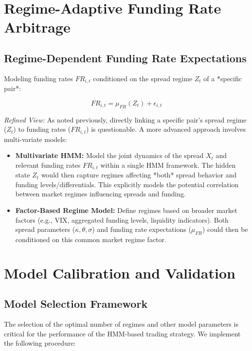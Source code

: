 \documentclass{article}
\begin{document}
\section{Regime-Adaptive Funding Rate Arbitrage}

\subsection{Regime-Dependent Funding Rate Expectations}

Modeling funding rates $FR_{i,t}$ conditioned on the spread regime $Z_t$ of a *specific pair*:

\begin{equation}
FR_{i,t} = \mu_{FR}(Z_t) + \epsilon_{i,t}
\end{equation}

\textit{Refined View:} As noted previously, directly linking a specific pair's spread regime ($Z_t$) to funding rates ($FR_{i,t}$) is questionable. A more advanced approach involves multi-variate models:

\begin{itemize}
    \item \textbf{Multivariate HMM:} Model the joint dynamics of the spread $X_t$ and relevant funding rates $FR_{i,t}$ within a single HMM framework. The hidden state $Z_t$ would then capture regimes affecting *both* spread behavior and funding levels/differentials. This explicitly models the potential correlation between market regimes influencing spreads and funding.
    \item \textbf{Factor-Based Regime Model:} Define regimes based on broader market factors (e.g., VIX, aggregated funding levels, liquidity indicators). Both spread parameters ($\kappa, \theta, \sigma$) and funding rate expectations ($\mu_{FR}$) could then be conditioned on this common market regime factor.
\end{itemize}

\section{Model Calibration and Validation}

\subsection{Model Selection Framework}

The selection of the optimal number of regimes and other model parameters is critical for the performance of the HMM-based trading strategy. We implement the following procedure:
\end{document}
